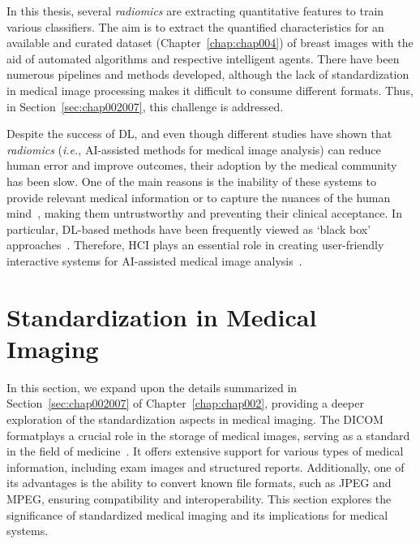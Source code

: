 In this thesis, several {\it radiomics} are extracting quantitative features to train various classifiers.
The aim is to extract the quantified characteristics for an available and curated dataset (Chapter~\ref{chap:chap004}) of breast images with the aid of automated algorithms and respective intelligent agents.
There have been numerous pipelines and methods developed, although the lack of standardization in medical image processing makes it difficult to consume different formats.
Thus, in Section~\ref{sec:chap002007}, this challenge is addressed.

Despite the success of \ac{DL}, and even though different studies have shown that {\it radiomics} ({\it i.e.}, \ac{AI}-assisted methods for medical image analysis) can reduce human error and improve outcomes, their adoption by the medical community has been slow.
One of the main reasons is the inability of these systems to provide relevant medical information or to capture the nuances of the human mind~\cite{KOHLI2018535, 10.1145/2858036.2858373}, making them untrustworthy and preventing their clinical acceptance.
In particular, \ac{DL}-based methods have been frequently viewed as `black box' approaches~\cite{litjens2017survey}.
Therefore, \ac{HCI} plays an essential role in creating user-friendly interactive systems for \ac{AI}-assisted medical image analysis~\cite{10.1145/3132272.3134111}.

\section{Standardization in Medical Imaging}
\label{sec:app001007}

In this section, we expand upon the details summarized in Section~\ref{sec:chap002007} of Chapter~\ref{chap:chap002}, providing a deeper exploration of the standardization aspects in medical imaging.
The \ac{DICOM} format\footnotemark[17] plays a crucial role in the storage of medical images, serving as a standard in the field of medicine~\cite{Trivedi2019}.
It offers extensive support for various types of medical information, including exam images and structured reports.
Additionally, one of its advantages is the ability to convert known file formats, such as \ac{JPEG} and \ac{MPEG}, ensuring compatibility and interoperability.
This section explores the significance of standardized medical imaging and its implications for medical systems.


